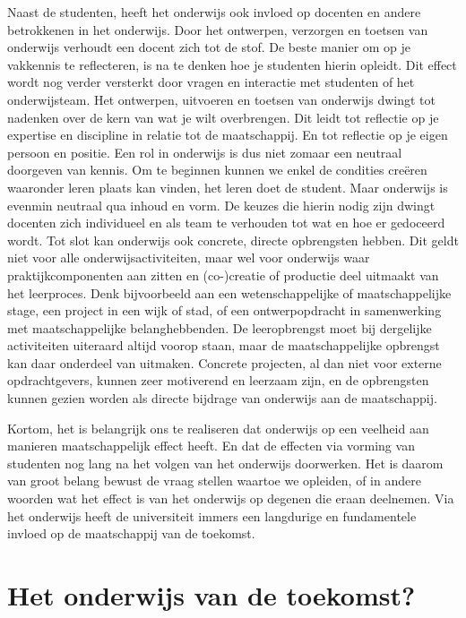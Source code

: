 \documentclass[smallauthor, chapterhaspagenum, nochapterinheader, pagenuminheader,  bigchapnum,medium2, tocpages,  garamond, titleinheader]{jote-book}
\begin{document}
	Naast de studenten, heeft het onderwijs ook invloed op docenten en andere betrokkenen in het onderwijs. Door het ontwerpen, verzorgen en toetsen van onderwijs verhoudt een docent zich tot de stof. De beste manier om op je vakkennis te reflecteren, is na te denken hoe je studenten hierin opleidt. Dit effect wordt nog verder versterkt door vragen en interactie met studenten of het onderwijsteam. Het ontwerpen, uitvoeren en toetsen van onderwijs dwingt tot nadenken over de kern van wat je wilt overbrengen. Dit leidt tot reflectie op je expertise en discipline in relatie tot de maatschappij. En tot reflectie op je eigen persoon en positie. Een rol in onderwijs is dus niet zomaar een neutraal doorgeven van kennis. Om te beginnen kunnen we enkel de condities creëren waaronder leren plaats kan vinden, het leren doet de student. Maar onderwijs is evenmin neutraal qua inhoud en vorm. De keuzes die hierin nodig zijn dwingt docenten zich individueel en als team te verhouden tot wat en hoe er gedoceerd wordt. Tot slot kan onderwijs ook concrete, directe opbrengsten hebben. Dit geldt niet voor alle onderwijsactiviteiten, maar wel voor onderwijs waar praktijkcomponenten aan zitten en (co-)creatie of productie deel uitmaakt van het leerproces. Denk bijvoorbeeld aan een wetenschappelijke of maatschappelijke stage, een project in een wijk of stad, of een ontwerpopdracht in samenwerking met maatschappelijke belanghebbenden. De leeropbrengst moet bij dergelijke activiteiten uiteraard altijd voorop staan, maar de maatschappelijke opbrengst kan daar onderdeel van uitmaken. Concrete projecten, al dan niet voor externe opdrachtgevers, kunnen zeer motiverend en leerzaam zijn, en de opbrengsten kunnen gezien worden als directe bijdrage van onderwijs aan de maatschappij.



	Kortom, het is belangrijk ons te realiseren dat onderwijs op een veelheid aan manieren maatschappelijk effect heeft. En dat de effecten via vorming van studenten nog lang na het volgen van het onderwijs doorwerken. Het is daarom van groot belang bewust de vraag stellen waartoe we opleiden, of in andere woorden wat het effect is van het onderwijs op degenen die eraan deelnemen. Via het onderwijs heeft de universiteit immers een langdurige en fundamentele invloed op de maatschappij van de toekomst.



	\section{Het onderwijs van de toekomst?}
\end{document}
